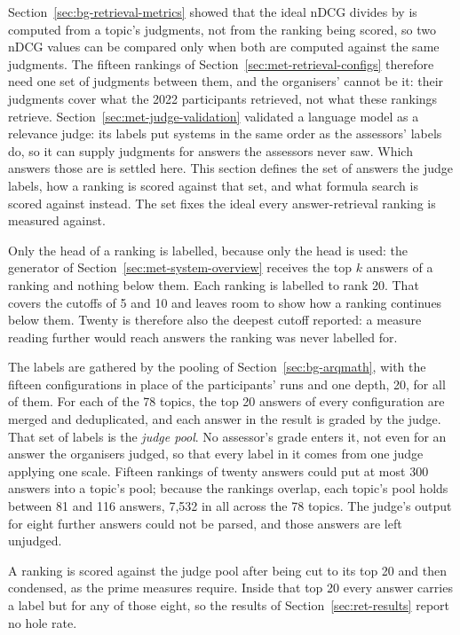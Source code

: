 Section~\ref{sec:bg-retrieval-metrics} showed that the ideal nDCG divides by is computed
from a topic's judgments, not from the ranking being scored, so two nDCG values can be
compared only when both are computed against the same judgments. The fifteen rankings of
Section~\ref{sec:met-retrieval-configs} therefore need one set of judgments between them,
and the organisers' cannot be it: their judgments cover what the 2022 participants
retrieved, not what these rankings retrieve.
Section~\ref{sec:met-judge-validation} validated a language model as a relevance judge:
its labels put systems in the same order as the assessors' labels do, so it can supply
judgments for answers the assessors never saw. Which answers those are is settled here.
This section defines the set of answers the judge labels, how a ranking is scored against
that set, and what formula search is scored against instead. The set fixes the ideal every
answer-retrieval ranking is measured against.

Only the head of a ranking is labelled, because only the head is used: the generator of
Section~\ref{sec:met-system-overview} receives the top $k$ answers of a ranking and nothing
below them. Each ranking is labelled to rank 20. That covers the cutoffs of 5 and 10 and
leaves room to show how a ranking continues below them. Twenty is therefore also the
deepest cutoff reported: a measure reading further would reach answers the ranking was
never labelled for.

The labels are gathered by the pooling of Section~\ref{sec:bg-arqmath}, with the fifteen
configurations in place of the participants' runs and one depth, 20, for all of them. For
each of the 78 topics, the top 20 answers of every configuration are merged and
deduplicated, and each answer in the result is graded by the judge. That set of labels is
the \emph{judge pool}. No assessor's grade enters it, not even for an answer the organisers
judged, so that every label in it comes from one judge applying one scale. Fifteen rankings
of twenty answers could put at most 300 answers into a topic's pool; because the rankings
overlap, each topic's pool holds between 81 and 116 answers, 7{,}532 in all across the 78
topics. The judge's output for eight further answers could not be parsed, and those answers
are left unjudged.

A ranking is scored against the judge pool after being cut to its top 20 and then
condensed, as the prime measures require. Inside that top 20 every answer carries a label
but for any of those eight, so the results of Section~\ref{sec:ret-results} report no hole
rate.

